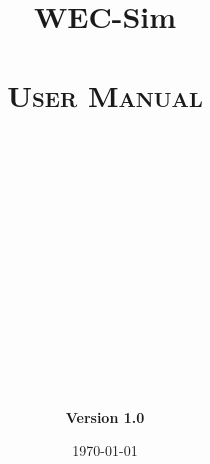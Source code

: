\documentclass[12pt,letterpaper]{report}
\title{\textbf{WEC-Sim \\ }  \textsc{\\ User Manual}}
\author{\\\\\\\\\\\\\\\\\\\\\\\\\\ \\\textbf{Version 1.0}}
\date{\today}
\begin{document}
\maketitle





\tableofcontents



\label{chap:theory}

\label{chap:gettingStarted}

\label{chap:libStructure}

\label{chap:codeStructure}

 \label{chap:application}




\end{document}

